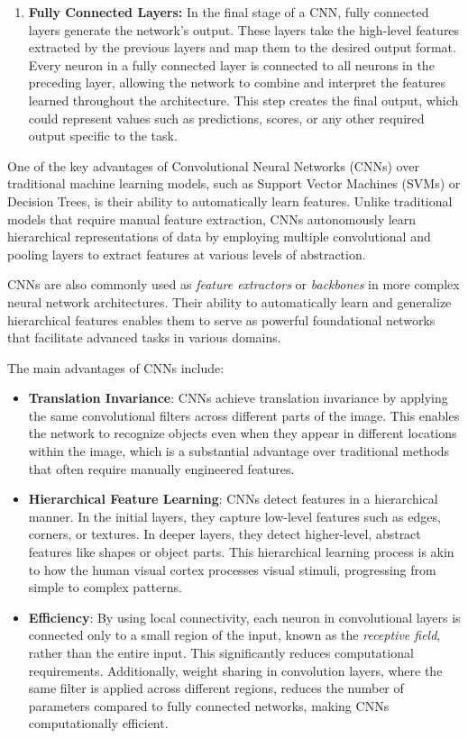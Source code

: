 \begin{enumerate}
    \item \textbf{Fully Connected Layers:} In the final stage of a CNN, fully connected layers generate the network's output. These layers take the high-level features extracted by the previous layers and map them to the desired output format. Every neuron in a fully connected layer is connected to all neurons in the preceding layer, allowing the network to combine and interpret the features learned throughout the architecture. This step creates the final output, which could represent values such as predictions, scores, or any other required output specific to the task.
    
\end{enumerate}

One of the key advantages of Convolutional Neural Networks (CNNs) over traditional machine learning models, such as Support Vector Machines (SVMs) or Decision Trees, is their ability to automatically learn features. Unlike traditional models that require manual feature extraction, CNNs autonomously learn hierarchical representations of data by employing multiple convolutional and pooling layers to extract features at various levels of abstraction.

CNNs are also commonly used as \textit{feature extractors} or \textit{backbones} in more complex neural network architectures. Their ability to automatically learn and generalize hierarchical features enables them to serve as powerful foundational networks that facilitate advanced tasks in various domains.

The main advantages of CNNs include:
\begin{itemize}
    \item \textbf{Translation Invariance}: CNNs achieve translation invariance by applying the same convolutional filters across different parts of the image. This enables the network to recognize objects even when they appear in different locations within the image, which is a substantial advantage over traditional methods that often require manually engineered features.

    \item \textbf{Hierarchical Feature Learning}: CNNs detect features in a hierarchical manner. In the initial layers, they capture low-level features such as edges, corners, or textures. In deeper layers, they detect higher-level, abstract features like shapes or object parts. This hierarchical learning process is akin to how the human visual cortex processes visual stimuli, progressing from simple to complex patterns.

    \item \textbf{Efficiency}: By using local connectivity, each neuron in convolutional layers is connected only to a small region of the input, known as the \textit{receptive field}, rather than the entire input. This significantly reduces computational requirements. Additionally, weight sharing in convolution layers, where the same filter is applied across different regions, reduces the number of parameters compared to fully connected networks, making CNNs computationally efficient.
\end{itemize}

